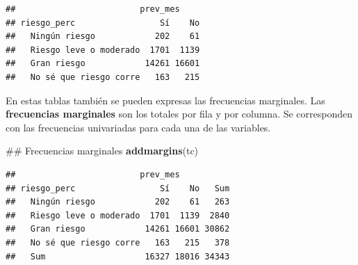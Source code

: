 \documentclass[spanish,]{book}
\newenvironment{Shaded}{\begin{snugshade}}{\end{snugshade}}
\newcommand{\KeywordTok}[1]{\textcolor[rgb]{0.13,0.29,0.53}{\textbf{#1}}}
\newcommand{\DataTypeTok}[1]{\textcolor[rgb]{0.13,0.29,0.53}{#1}}
\newcommand{\DecValTok}[1]{\textcolor[rgb]{0.00,0.00,0.81}{#1}}
\newcommand{\StringTok}[1]{\textcolor[rgb]{0.31,0.60,0.02}{#1}}
\newcommand{\OperatorTok}[1]{\textcolor[rgb]{0.81,0.36,0.00}{\textbf{#1}}}
\newcommand{\NormalTok}[1]{#1}
\begin{document}
\begin{Shaded}
\end{Shaded}

\begin{verbatim}
##                         prev_mes
## riesgo_perc                 Sí    No
##   Ningún riesgo            202    61
##   Riesgo leve o moderado  1701  1139
##   Gran riesgo            14261 16601
##   No sé que riesgo corre   163   215
\end{verbatim}

En estas tablas también se pueden expresas las frecuencias marginales.
Las \textbf{frecuencias marginales} son los totales por fila y por
columna. Se corresponden con las frecuencias univariadas para cada una
de las variables.

\begin{Shaded}
\begin{Highlighting}[]
\NormalTok{## Frecuencias marginales}
\KeywordTok{addmargins}\NormalTok{(tc)}
\end{Highlighting}
\end{Shaded}

\begin{verbatim}
##                         prev_mes
## riesgo_perc                 Sí    No   Sum
##   Ningún riesgo            202    61   263
##   Riesgo leve o moderado  1701  1139  2840
##   Gran riesgo            14261 16601 30862
##   No sé que riesgo corre   163   215   378
##   Sum                    16327 18016 34343
\end{verbatim}
\end{document}
